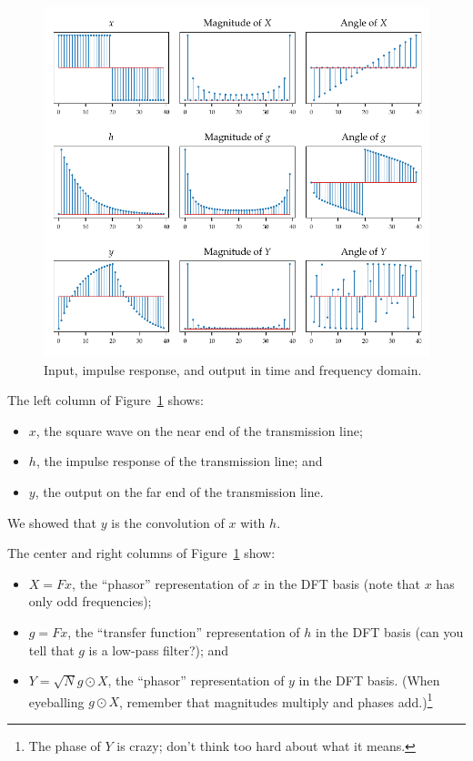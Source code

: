 \begin{figure}
  \includegraphics{27-figs/inHout}
  \caption{Input, impulse response, and output in time and frequency domain.}
  \label{fig:lec27-inHout}
\end{figure}
The left column of Figure~\ref{fig:lec27-inHout} shows:
\begin{itemize}
  \item \(x\), the square wave on the near end of the transmission line;
  \item \(h\), the impulse response of the transmission line; and
  \item \(y\), the output on the far end of the transmission line.
\end{itemize}
We showed that \(y\) is the convolution of \(x\) with \(h\).

The center and right columns of Figure~\ref{fig:lec27-inHout} show:
\begin{itemize}
  \item \(X= Fx\), the ``phasor'' representation of \(x\) in the DFT basis (note that \(x\) has only odd frequencies);
  \item \(g = Fx\), the ``transfer function'' representation of \(h\) in the DFT basis (can you tell that \(g\) is a low-pass filter?); and
  \item \(Y = \sqrt{N} g \odot X\), the ``phasor'' representation of \(y\) in the DFT basis. (When eyeballing \(g \odot X\), remember that magnitudes multiply and phases add.)\footnote{The phase of \(Y\) is crazy; don't think too hard about what it means.}
\end{itemize}

